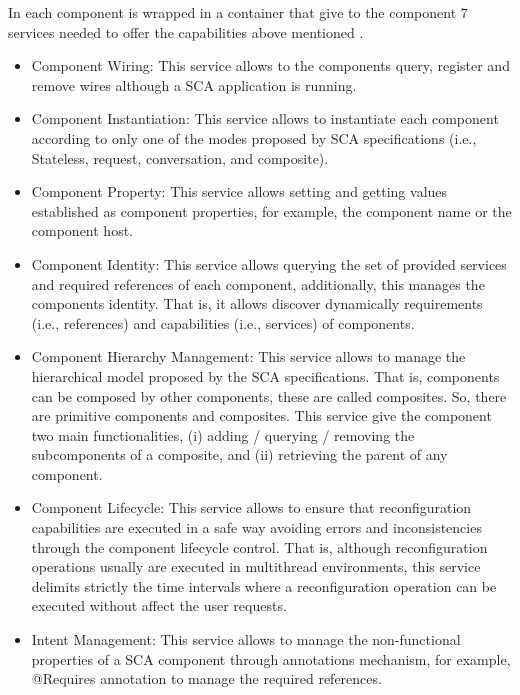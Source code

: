 In \frascati{} each component is wrapped in a \frascati{} container that give to the component 7 services needed to offer the capabilities above mentioned \cite{seinturier2009reconfigurable}. 

\begin{itemize}
	\item Component Wiring: This service allows to the components query, register and remove wires although a SCA application is running.
	
	\item Component Instantiation: This service allows to instantiate each component according to only one of the modes proposed by SCA specifications (i.e., Stateless, request, conversation, and composite).
	
	\item Component Property: This service allows setting and getting values established as component properties, for example, the component name or the component host.  
	
	\item Component Identity: This service allows querying the set of provided services and required references of each component, additionally, this manages the components identity. That is, it allows discover dynamically requirements (i.e., references) and capabilities (i.e., services) of components.
	
	\item Component Hierarchy Management: This service allows to manage the hierarchical model proposed by the SCA specifications. That is, components can be composed by other components, these are called composites. So, there are primitive components and composites. This service give the component two main functionalities, (i) adding / querying / removing the subcomponents of a composite, and (ii) retrieving the parent of any component. 
	
	\item Component Lifecycle: This service allows to ensure that reconfiguration capabilities are executed in a safe way avoiding errors and inconsistencies through the component lifecycle control. That is, although reconfiguration operations usually are executed in multithread environments, this service delimits strictly the time intervals where a reconfiguration operation can be executed without affect the user requests.   
	
	\item Intent Management: This service allows to manage the non-functional properties of a SCA component through annotations mechanism, for example, @Requires annotation to manage the required references.
	
\end{itemize}


